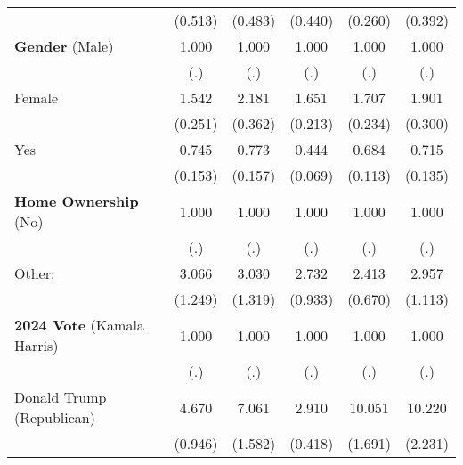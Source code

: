 \begin{table}[htbp]
\begin{tabular}{l*{5}{c}}
                    &     (0.513)         &     (0.483)         &     (0.440)         &     (0.260)         &     (0.392)         \\
\textbf{Gender} (Male)&       1.000         &       1.000         &       1.000         &       1.000         &       1.000         \\
                    &         (.)         &         (.)         &         (.)         &         (.)         &         (.)         \\
Female              &       1.542\sym{***}&       2.181\sym{***}&       1.651\sym{***}&       1.707\sym{***}&       1.901\sym{***}\\
                    &     (0.251)         &     (0.362)         &     (0.213)         &     (0.234)         &     (0.300)         \\
Yes                 &       0.745         &       0.773         &       0.444\sym{***}&       0.684\sym{**} &       0.715\sym{*}  \\
                    &     (0.153)         &     (0.157)         &     (0.069)         &     (0.113)         &     (0.135)         \\
\textbf{Home Ownership} (No)&       1.000         &       1.000         &       1.000         &       1.000         &       1.000         \\
                    &         (.)         &         (.)         &         (.)         &         (.)         &         (.)         \\
Other:              &       3.066\sym{***}&       3.030\sym{**} &       2.732\sym{***}&       2.413\sym{***}&       2.957\sym{***}\\
                    &     (1.249)         &     (1.319)         &     (0.933)         &     (0.670)         &     (1.113)         \\
\textbf{2024 Vote} (Kamala Harris)&       1.000         &       1.000         &       1.000         &       1.000         &       1.000         \\
                    &         (.)         &         (.)         &         (.)         &         (.)         &         (.)         \\
Donald Trump (Republican)&       4.670\sym{***}&       7.061\sym{***}&       2.910\sym{***}&      10.051\sym{***}&      10.220\sym{***}\\
                    &     (0.946)         &     (1.582)         &     (0.418)         &     (1.691)         &     (2.231)         \\

\end{tabular}
\end{table}

